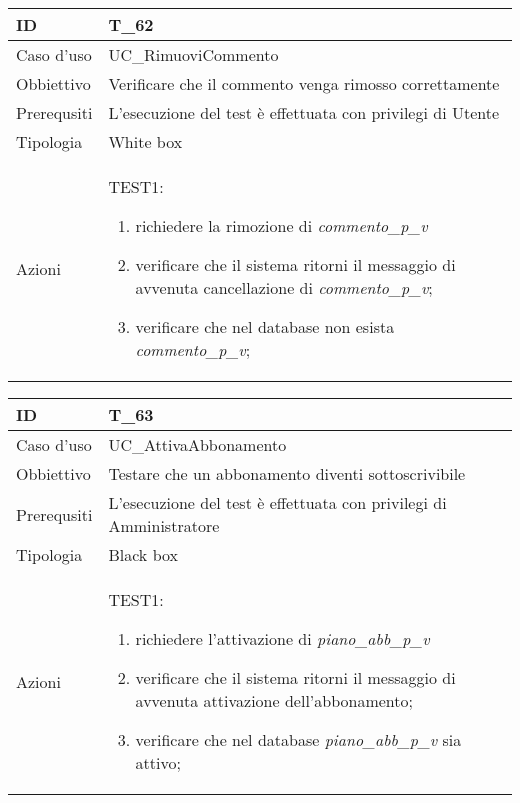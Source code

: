 \begin{table}[hb]
    \centering
    \begin{tabular}{ |p{2cm}|p{10cm}|  }
        \hline
        ID          & T\_62                                                      \\\hline
        Caso d'uso  & UC\_RimuoviCommento                                        \\\hline
        Obbiettivo  & Verificare che il commento venga rimosso correttamente     \\\hline
        Prerequsiti & L'esecuzione del test è effettuata con privilegi di Utente \\\hline
        Tipologia   & White box                                                  \\\hline
        Azioni      &
        TEST1:
        \begin{enumerate}[nosep, topsep=0pt]
            \item richiedere la rimozione di \emph{commento\_p\_v}
            \item verificare che il sistema ritorni il messaggio di avvenuta cancellazione di \emph{commento\_p\_v};
            \item verificare che nel database non esista \emph{commento\_p\_v};
        \end{enumerate}
        \\\hline
    \end{tabular}
\end{table}


\begin{table}[hb]
    \centering
    \begin{tabular}{ |p{2cm}|p{10cm}|  }
        \hline
        ID          & T\_63                                                              \\\hline
        Caso d'uso  & UC\_AttivaAbbonamento                                              \\\hline
        Obbiettivo  & Testare che un abbonamento diventi sottoscrivibile                 \\\hline
        Prerequsiti & L'esecuzione del test è effettuata con privilegi di Amministratore \\\hline
        Tipologia   & Black box                                                          \\\hline
        Azioni      &
        TEST1:
        \begin{enumerate}[nosep, topsep=0pt]
            \item richiedere l'attivazione di \emph{piano\_abb\_p\_v}
            \item verificare che il sistema ritorni il messaggio di avvenuta attivazione dell'abbonamento;
            \item verificare che nel database \emph{piano\_abb\_p\_v} sia attivo;
        \end{enumerate}
        \\\hline
    \end{tabular}
\end{table}